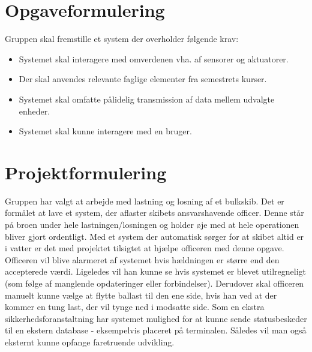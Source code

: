 \chapter{Opgaveformulering}
\label{ch:Opgaveformulering}
Gruppen skal fremstille et system der overholder følgende krav:
\begin{itemize}
\item Systemet skal interagere med omverdenen vha. af sensorer og aktuatorer. 
\item Der skal anvendes relevante faglige elementer fra semestrets kurser. 
\item Systemet skal omfatte pålidelig transmission af data mellem udvalgte enheder. 
\item Systemet skal kunne interagere med en bruger. 
\end{itemize}

\chapter{Projektformulering}
\label{ch:Projektformulering}
Gruppen har valgt at arbejde med lastning og losning af et bulkskib. Det er formålet at lave et system, der aflaster skibets ansvarshavende officer. Denne står på broen under hele lastningen/losningen og holder øje med at hele operationen bliver gjort ordentligt. Med et system der automatisk sørger for at skibet altid er i vatter er det med projektet tilsigtet at hjælpe officeren med denne opgave.  
Officeren vil blive alarmeret af systemet hvis hældningen er større end den accepterede værdi. Ligeledes vil han kunne se hvis systemet er blevet utilregneligt (som følge af manglende opdateringer eller forbindelser). 
Derudover skal officeren manuelt kunne vælge at flytte ballast til den ene side, hvis han ved at der kommer en tung last, der vil tynge ned i modsatte side. Som en ekstra sikkerhedsforanstaltning har systemet mulighed for at kunne sende statusbeskeder til en ekstern database - eksempelvis placeret på terminalen. Således vil man også eksternt kunne opfange faretruende udvikling.